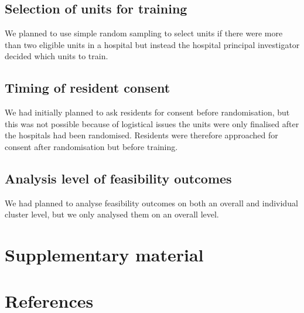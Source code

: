 \documentclass[
]{article}
\begin{document}
\hypertarget{selection-of-units-for-training}{%
\subsection{Selection of units for training}\label{selection-of-units-for-training}}

We planned to use simple random sampling to select units if there were more than two eligible units in a hospital but instead the hospital principal investigator decided which units to train.

\hypertarget{timing-of-resident-consent}{%
\subsection{Timing of resident consent}\label{timing-of-resident-consent}}

We had initially planned to ask residents for consent before
randomisation, but this was not possible because of logistical issues the units were only finalised after the hospitals had been randomised. Residents were therefore approached for consent after randomisation but before training.

\hypertarget{analysis-level-of-feasibility-outcomes}{%
\subsection{Analysis level of feasibility outcomes}\label{analysis-level-of-feasibility-outcomes}}

We had planned to analyse feasibility outcomes on both an overall and individual cluster level, but we only analysed them on an overall level.

\pagebreak

\hypertarget{supplementary-material}{%
\section{Supplementary material}\label{supplementary-material}}

\hypertarget{references}{%
\section*{References}\label{references}}
\end{document}
